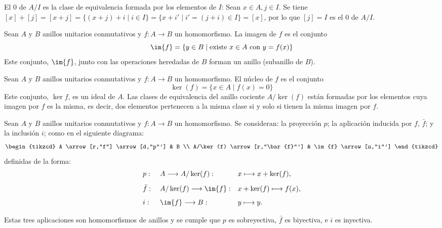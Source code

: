 \begin{obs}
    El 0 de  $A/I$ es la clase de equivalencia formada por los elementos de $I$:
        Sean $x\in A, j\in I$. Se tiene $[x] + [j] = [x + j] = \{(x + j) + i \mid i\in I\} = \{x + i' \mid i' = (j + i)\in I\} = [x]$, por lo que $[j] =  I$ es el 0 de $A/I$.
           
\end{obs}


\begin{deff}{\cite[p.~31]{GamboaAnillos}}
    Sean $A$ y $B$ anillos unitarios conmutativos y $f: A \longrightarrow B$ un homomorfismo. La imagen de $f$ es el conjunto  \[\im{f} = \{y\in B \mid \text{existe }x \in A \text{ con } y = f(x)\}\] Este conjunto, $\im{f}$, junto con las operaciones heredadas de $B$ forman un anillo (subanillo de $B$).
\end{deff}
\begin{deff}{\cite[p.~31]{GamboaAnillos}} \label{definicion:nucleo_homomorfismo}
    Sean $A$ y $B$ anillos unitarios conmutativos y $f: A \longrightarrow B$ un homomorfismo. El núcleo de $f$ es el conjunto  \[\ker(f) = \{x\in A \mid f(x) = 0\}\] Este conjunto, $\ker{f}$, es un ideal de $A$. Las clases de equivalencia del anillo cociente $A/\ker(f)$ están formadas por los elementos cuya imagen por $f$ es la misma, es decir, dos elementos pertenecen a la misma clase si y solo si tienen la misma imagen por $f$.
\end{deff}

\begin{deff}{\cite[p.~32]{GamboaAnillos}\label{teorema_isomorfia}}
    Sean $A$ y $B$ anillos unitarios conmutativos y $f: A \longrightarrow B$ un homomorfismo. Se consideran: la proyección $p$; la aplicación inducida por $f$, $\bar{f}$; y la inclusión $i$; como en el siguiente diagrama:
    \[
        \begin{tikzcd}
        A \arrow[r,"f"] \arrow[d,"p"']
        & B \\
        A/\ker(f) \arrow[r,"\bar{f}"']
        & \im{f} \arrow[u,"i"']
        \end{tikzcd}
    \]
    definidas de la forma:
\begin{align*}
&&& p:        &&\; A \longrightarrow A/\ker(f):         && x \longmapsto x+\ker(f),     &&\\[1ex]
&&& \bar{f}:  &&\; A/\ker(f) \longrightarrow \im{f}:    && x+\ker(f) \longmapsto f(x),  &&\\[1ex]
&&& i:        &&\; \im{f} \longrightarrow B:            && y \longmapsto y.             &&
\end{align*}

Estas tres aplicaciones son homomorfismos de anillos y se cumple que $p$ es sobreyectiva, $\bar f$ es biyectiva, e $i$ es inyectiva.     
\end{deff}

